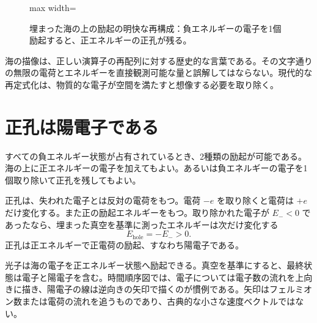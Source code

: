 \begin{figure}[htbp]
\centering
\begin{adjustbox}{max width=\linewidth}
\end{adjustbox}
\caption{埋まった海の上の励起の明快な再構成：負エネルギーの電子を1個励起すると、正エネルギーの正孔が残る。}
\end{figure}

海の描像は、正しい演算子の再配列に対する歴史的な言葉である。その文字通りの無限の電荷とエネルギーを直接観測可能な量と誤解してはならない。現代的な再定式化は、物質的な電子が空間を満たすと想像する必要を取り除く。

\section{正孔は陽電子である}

すべての負エネルギー状態が占有されているとき、2種類の励起が可能である。海の上に正エネルギーの電子を加えてもよい。あるいは負エネルギーの電子を1個取り除いて正孔を残してもよい。

正孔は、失われた電子とは反対の電荷をもつ。電荷 \(-e\) を取り除くと電荷は \(+e\) だけ変化する。また正の励起エネルギーをもつ。取り除かれた電子が \(E_-<0\) であったなら、埋まった真空を基準に測ったエネルギーは次だけ変化する
\begin{equation}
E_{\mathrm{hole}}=-E_->0.
\end{equation}
正孔は正エネルギーで正電荷の励起、すなわち陽電子である。

光子は海の電子を正エネルギー状態へ励起できる。真空を基準にすると、最終状態は電子と陽電子を含む。時間順序図では、電子については電子数の流れを上向きに描き、陽電子の線は逆向きの矢印で描くのが慣例である。矢印はフェルミオン数または電荷の流れを追うものであり、古典的な小さな速度ベクトルではない。

